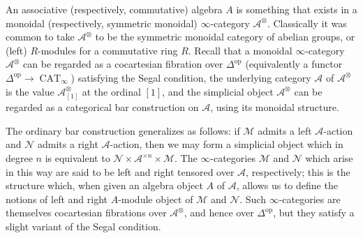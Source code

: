\documentclass{article}
\theoremstyle{definition}
\newcommand{\A}{\mathcal{A}}
\newcommand{\M}{\mathcal{M}}
\newcommand{\N}{\mathcal{N}}
\renewcommand{\i}{\infty}
\newcommand{\op}{\mathrm{op}}
\DeclareMathOperator{\CAT}{CAT}
\begin{document}
An associative (respectively, commutative) algebra $A$ is something that exists in a monoidal (respectively, symmetric monoidal) $\i$-category $\A^\otimes$.
Classically it was common to take $\A^\otimes$ to be the symmetric monoidal category of abelian groups, or (left) $R$-modules for a commutative ring $R$.
Recall that a monoidal $\i$-category $\A^\otimes$ can be regarded as a cocartesian fibration over $\Delta^{\op}$ (equivalently a functor $\Delta^{\op}\to\CAT_\i$)  satisfying the Segal condition, the underlying category $\A$ of $\A^\otimes$ is the value $\A^\otimes_{[1]}$ at the ordinal $[1]$, and the simplicial object $\A^\otimes$ can be regarded as a categorical bar construction on $\A$, using its monoidal structure.

The ordinary bar construction generalizes as follows:  if $\M$ admits a left $\A$-action and $\N$ admits a right $\A$-action, then we may form a simplicial object which in degree $n$ is equivalent to $\N\times\A^{\times n}\times\M$.
The $\infty$-categories $\M$ and $\N$ which arise in this way are said to be left and right tensored over $\A$, respectively; this is the structure which, when given an algebra object $A$ of $\A$, allows us to define the notions of left and right $A$-module object of $\M$ and $\N$.
Such $\i$-categories are themselves cocartesian fibrations over $\A^\otimes$, and hence over $\Delta^{\op}$, but they satisfy a slight variant of the Segal condition.
\end{document}
